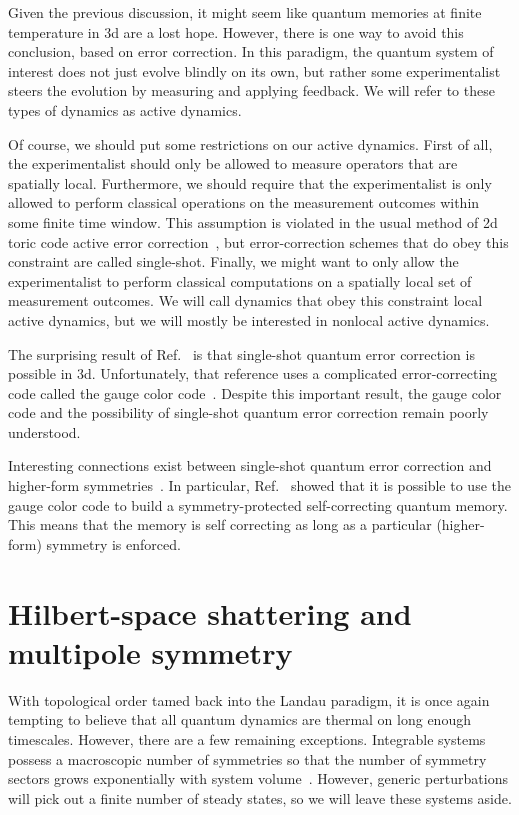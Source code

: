 Given the previous discussion, it might seem like quantum memories at finite temperature in 3d are a lost hope. However, there is one way to avoid this conclusion, based on error correction. In this paradigm, the quantum system of interest does not just evolve blindly on its own, but rather some experimentalist steers the evolution by measuring and applying feedback. We will refer to these types of dynamics as active dynamics. 

Of course, we should put some restrictions on our active dynamics. First of all, the experimentalist should only be allowed to measure operators that are spatially local. Furthermore, we should require that the experimentalist is only allowed to perform classical operations on the measurement outcomes within some finite time window. This assumption is violated in the usual method of 2d toric code active error correction~\cite{Dennis2002Topological}, but error-correction schemes that do obey this constraint are called single-shot. Finally, we might want to only allow the experimentalist to perform classical computations on a spatially local set of measurement outcomes. We will call dynamics that obey this constraint local active dynamics, but we will mostly be interested in nonlocal active dynamics.

The surprising result of Ref.~\cite{Bombin2015SingleShot} is that single-shot quantum error correction is possible in 3d. Unfortunately, that reference uses a complicated error-correcting code called the gauge color code~\cite{Bombin2015Gauge}. Despite this important result, the gauge color code and the possibility of single-shot quantum error correction remain poorly understood. 

Interesting connections exist between single-shot quantum error correction and higher-form symmetries~\cite{Roberts2017SPTO, Kubica2018Ungauging}. In particular, Ref.~\cite{RobertsBartlett2020} showed that it is possible to use the gauge color code to build a symmetry-protected self-correcting quantum memory. This means that the memory is self correcting as long as a particular (higher-form) symmetry is enforced.

\section{Hilbert-space shattering and multipole symmetry}

With topological order tamed back into the Landau paradigm, it is once again tempting to believe that all quantum dynamics are thermal on long enough timescales. However, there are a few remaining exceptions. Integrable systems possess a macroscopic number of symmetries so that the number of symmetry sectors grows exponentially with system volume~\cite{Baxter2016Exactly}. However, generic perturbations will pick out a finite number of steady states, so we will leave these systems aside.

